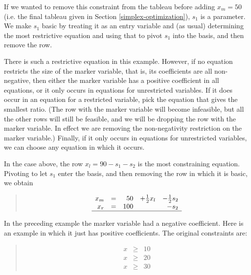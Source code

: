 \documentclass{article}
\begin{document}
If we wanted to remove this constraint
from the tableau before adding $x_m = 50$ (i.e. the final tableau given in
Section \ref{simplex-optimization}), $s_1$ is a parameter.
We make $s_1$ basic by treating it as an entry variable and
(as usual) determining the most restrictive equation and using that 
to pivot $s_1$ into the basis, and then remove the row.

There is such a restrictive equation in this example.  However, if no
equation restricts the size of the marker variable, that is, its
coefficients are all non-negative, then either the marker variable has a
positive coefficient in all equations, or it only occurs in equations for
unrestricted variables.  If it does occur in an equation for a restricted
variable, pick the equation that gives the smallest ratio.  (The row with
the marker variable will become infeasible, but all the other rows will
still be feasible, and we will be dropping the row with the marker
variable.  In effect we are removing the non-negativity restriction on the
marker variable.)  Finally, if it only occurs in equations for unrestricted
variables, we can choose any equation in which it occurs.

In the case above, the row $x_l  = 90  - s_1  - s_2$
is the most constraining equation.
Pivoting to let $s_1$ enter the
basis, and then removing the row in which it is basic, we obtain
\begin{quote}\vspace*{-1ex}
$$
\begin{array}{rlrrr} 
x_m & = &50 & + \frac{1}{2} x_l & - \frac{1}{2} s_2 \\
x_r & = &100 &  & - s_2 \\ \hline
\end{array}
$$
\end{quote}\vspace{-0.9ex}

In the preceding example the marker variable had a negative coefficient.
Here is an example in which it just has positive coefficients.  
The original constraints are:

\begin{quote}\vspace*{-1ex}
$$
\begin{array}{rlrrr} 
x & \geq & 10   \\
x & \geq & 20   \\
x & \geq & 30 
\end{array}
$$
\end{quote}\vspace{-0.9ex}
\end{document}
